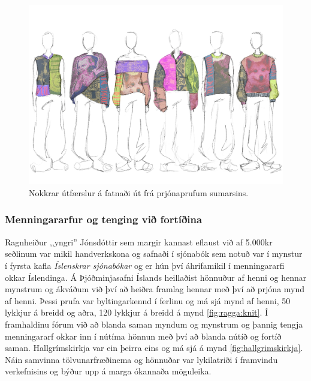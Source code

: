 \begin{figure}[t]
    \centering
    \includegraphics[width=\linewidth]{myndir/gisa/collection.JPG}
    \caption{Nokkrar útfærslur á fatnaði út frá prjónaprufum sumarsins.}
    \label{fig:designproposal}
\end{figure}

\subsubsection{Menningararfur og tenging við fortíðina}
Ragnheiður ,,yngri'' Jónsdóttir sem margir kannast eflaust við af 5.000kr seðlinum var mikil handverkskona og safnaði í sjónabók sem notuð var í mynstur í fyrsta kafla \textit{Íslenskrar sjónabókar} og er hún því áhrifamikil í menningararfi okkar Íslendinga. Á Þjóðminjasafni Íslands heillaðist hönnuður af henni og hennar mynstrum og ákváðum við því að heiðra framlag hennar með því að prjóna mynd af henni. Þessi prufa var byltingarkennd í ferlinu og má sjá mynd af henni, 50 lykkjur á breidd og aðra, 120 lykkjur á breidd á mynd \ref{fig:ragga:knit}. Í framhaldinu fórum við að blanda saman myndum og mynstrum og þannig tengja menningararf okkar inn í nútíma hönnun með því að blanda nútíð og fortíð saman. Hallgrímskirkja var ein þeirra eins og má sjá á mynd \ref{fig:hallgrimskirkja}. Náin samvinna tölvunarfræðinema og hönnuðar var lykilatriði í framvindu verkefnisins og býður upp á marga ókannaða möguleika. 

